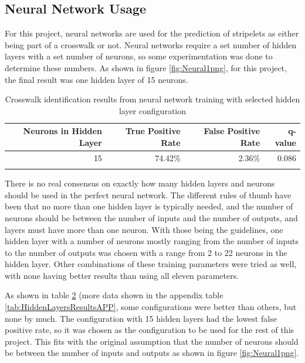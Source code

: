 \documentclass[12pt]{ucthesis}
\begin{document}
\subsection{Neural Network Usage}
For this project, neural networks are used for the prediction of stripelets as either being part of a crosswalk or not. Neural networks require a set number of hidden layers with a set number of neurons, so some experimentation was done to determine these numbers. As shown in figure \ref{fig:Neural1png}, for this project, the final result was one hidden layer of 15 neurons. 

    \begin{table}[t]
        \begin{longtable}{| r | r | r | r |}
        \hline
        Neurons in Hidden Layer & True Positive Rate & False Positive Rate & q-value \bigstrut\\
        \hline
        15 & 74.42\% & 2.36\% & 0.086 \bigstrut\\
        \hline
        \caption[Selected Neural Network Configuration Results]{Crosswalk identification results from neural network training with selected hidden layer configuration}
        \label{tab:NN-HiddenLayersResults} 
        \end{longtable}
    \end{table}

There is no real consensus on exactly how many hidden layers and neurons should be used in the perfect neural network. The different rules of thumb\cite{Heaton:2008:INN:1502373} have been that no more than one hidden layer is typically needed, and the number of neurons should be between the number of inputs and the number of outputs, and layers must have more than one neuron. With those being the guidelines, one hidden layer with a number of neurons mostly ranging from the number of inputs to the number of outputs was chosen with a range from 2 to 22 neurons in the hidden layer. Other combinations of these training parameters were tried as well, with none having better results than using all eleven parameters. 



As shown in table \ref{tab:NN-HiddenLayersResults} (more data shown in the appendix table \ref{tab:HiddenLayersResultsAPP}, some configurations were better than others, but none by much. The configuration with 15 hidden layers had the lowest false positive rate, so it was chosen as the configuration to be used for the rest of this project. This fits with the original assumption that the number of neurons should be between the number of inputs and outputs as shown in figure \ref{fig:Neural1png}. 
\end{document}
